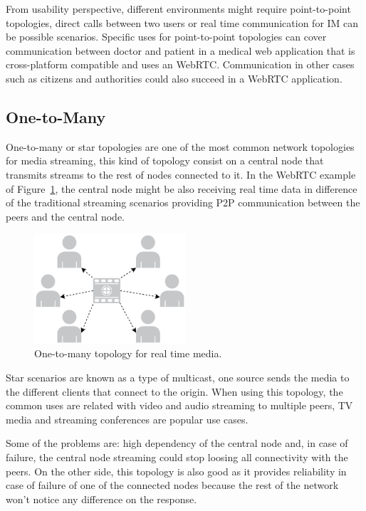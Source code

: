 From usability perspective, different environments might require point-to-point topologies, direct calls between two users or real time communication for IM can be possible scenarios. Specific uses for point-to-point topologies can cover communication between doctor and patient in a medical web application that is cross-platform compatible and uses an WebRTC. Communication in other cases such as citizens and authorities could also succeed in a WebRTC application.
 
\subsection{One-to-Many}

One-to-many or star topologies are one of the most common network topologies for media streaming, this kind of topology consist on a central node that transmits streams to the rest of nodes connected to it. In the WebRTC example of Figure~\ref{fig:starExample}, the central node might be also receiving real time data in difference of the traditional streaming scenarios providing P2P communication between the peers and the central node.

 \begin{figure}[h]
  \centering
    \includegraphics[width=0.5\textwidth]{./figures/star.pdf}
      \caption[One-to-many topology for real time media]{One-to-many topology for real time media.}
	\label{fig:starExample}
\end{figure}

Star scenarios are known as a type of multicast, one source sends the media to the different clients that connect to the origin. When using this topology, the common uses are related with video and audio streaming to multiple peers, TV media and streaming conferences are popular use cases.

Some of the problems are: high dependency of the central node and, in case of failure, the central node streaming could stop loosing all connectivity with the peers. On the other side, this topology is also good as it provides reliability in case of failure of one of the connected nodes because the rest of the network won't notice any difference on the response. 


